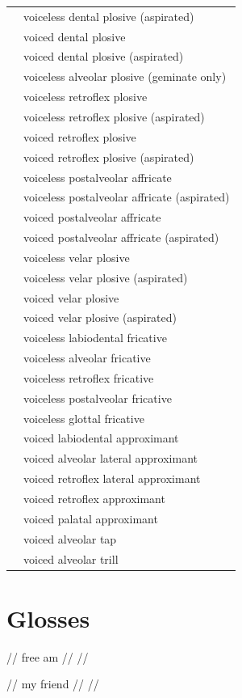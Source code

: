 \documentclass{article}
\begin{document}
\begin{xltabular}{\textwidth}{lL}
   & voiceless dental plosive (aspirated) \\
   & voiced dental plosive \\
   & voiced dental plosive (aspirated) \\
   & voiceless alveolar plosive (geminate only) \\
   & voiceless retroflex plosive \\
   & voiceless retroflex plosive (aspirated) \\
   & voiced retroflex plosive \\
   & voiced retroflex plosive (aspirated) \\
   & voiceless postalveolar affricate \\
   & voiceless postalveolar affricate (aspirated) \\
   & voiced postalveolar affricate \\
   & voiced postalveolar affricate (aspirated) \\
   & voiceless velar plosive \\
   & voiceless velar plosive (aspirated) \\
   & voiced velar plosive \\
   & voiced velar plosive (aspirated) \\
   & voiceless labiodental fricative \\
   & voiceless alveolar fricative \\
   & voiceless retroflex fricative \\
   & voiceless postalveolar fricative \\
   & voiceless glottal fricative \\
   & voiced labiodental approximant \\
   & voiced alveolar lateral approximant \\
   & voiced retroflex lateral approximant \\
   & voiced retroflex approximant \\
   & voiced palatal approximant \\
   & voiced alveolar tap \\
   & voiced alveolar trill \\
\end{xltabular}

\newpage\section{Glosses}

\ex
\begingl
\gla {}   //
 free am //
 //
\endgl
\xe

\ex
\begingl
\gla {}   //
 my friend //
 //
\endgl
\xe
\end{document}
